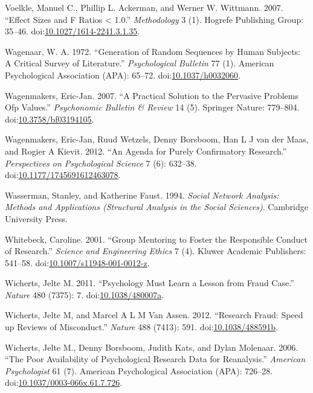 \documentclass[a5paper]{book}
\begin{document}
\hypertarget{ref-doi:10.1027ux2f1614-2241.3.1.35}{}
Voelkle, Manuel C., Phillip L. Ackerman, and Werner W. Wittmann. 2007.
``Effect Sizes and F Ratios \textless{} 1.0.'' \emph{Methodology} 3 (1).
Hogrefe Publishing Group: 35--46.
doi:\href{https://doi.org/10.1027/1614-2241.3.1.35}{10.1027/1614-2241.3.1.35}.

\hypertarget{ref-doi:10.1037ux2fh0032060}{}
Wagenaar, W. A. 1972. ``Generation of Random Sequences by Human
Subjects: A Critical Survey of Literature.'' \emph{Psychological
Bulletin} 77 (1). American Psychological Association (APA): 65--72.
doi:\href{https://doi.org/10.1037/h0032060}{10.1037/h0032060}.

\hypertarget{ref-doi:10.3758ux2fbf03194105}{}
Wagenmakers, Eric-Jan. 2007. ``A Practical Solution to the Pervasive
Problems Ofp Values.'' \emph{Psychonomic Bulletin \& Review} 14 (5).
Springer Nature: 779--804.
doi:\href{https://doi.org/10.3758/bf03194105}{10.3758/bf03194105}.

\hypertarget{ref-doi:10.1177ux2f1745691612463078}{}
Wagenmakers, Eric-Jan, Ruud Wetzels, Denny Borsboom, Han L J van der
Maas, and Rogier A Kievit. 2012. ``An Agenda for Purely Confirmatory
Research.'' \emph{Perspectives on Psychological Science} 7 (6): 632--38.
doi:\href{https://doi.org/10.1177/1745691612463078}{10.1177/1745691612463078}.

\hypertarget{ref-isbn:9780521387071}{}
Wasserman, Stanley, and Katherine Faust. 1994. \emph{Social Network
Analysis: Methods and Applications (Structural Analysis in the Social
Sciences)}. Cambridge University Press.

\hypertarget{ref-doi:10.1007ux2fs11948-001-0012-z}{}
Whitebeck, Caroline. 2001. ``Group Mentoring to Foster the Responsible
Conduct of Research.'' \emph{Science and Engineering Ethics} 7 (4).
Kluwer Academic Publishers: 541--58.
doi:\href{https://doi.org/10.1007/s11948-001-0012-z}{10.1007/s11948-001-0012-z}.

\hypertarget{ref-doi:10.1038ux2f480007a}{}
Wicherts, Jelte M. 2011. ``Psychology Must Learn a Lesson from Fraud
Case.'' \emph{Nature} 480 (7375): 7.
doi:\href{https://doi.org/10.1038/480007a}{10.1038/480007a}.

\hypertarget{ref-doi:10.1038ux2f488591b}{}
Wicherts, Jelte M, and Marcel A L M Van Assen. 2012. ``Research Fraud:
Speed up Reviews of Misconduct.'' \emph{Nature} 488 (7413): 591.
doi:\href{https://doi.org/10.1038/488591b}{10.1038/488591b}.

\hypertarget{ref-doi:10.1037ux2f0003-066x.61.7.726}{}
Wicherts, Jelte M., Denny Borsboom, Judith Kats, and Dylan Molenaar.
2006. ``The Poor Availability of Psychological Research Data for
Reanalysis.'' \emph{American Psychologist} 61 (7). American
Psychological Association (APA): 726--28.
doi:\href{https://doi.org/10.1037/0003-066x.61.7.726}{10.1037/0003-066x.61.7.726}.
\end{document}
